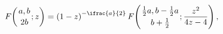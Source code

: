 \[\mathop{F\/}\nolimits\!\left({a,b\atop 2b};z\right)=\left(1-z\right)^{-\ifrac{%
a}{2}}\mathop{F\/}\nolimits\!\left({\tfrac{1}{2}a,b-\tfrac{1}{2}a\atop b+%
\tfrac{1}{2}};\frac{z^{2}}{4z-4}\right),\]